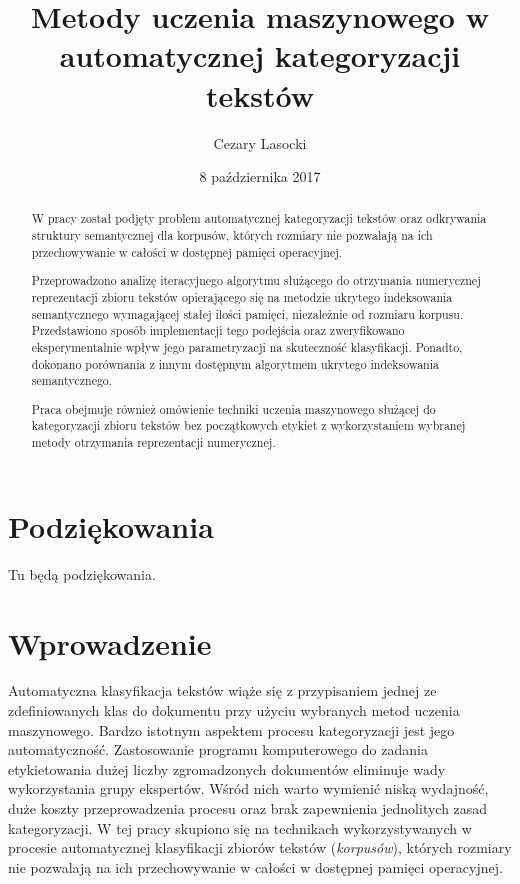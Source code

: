 \documentclass{pracamgr}
\author{Cezary Lasocki}
\title{Metody uczenia maszynowego w automatycznej kategoryzacji tekstów}
\date{8 października 2017}
\begin{document}
\maketitle

\begin{abstract}

W pracy został podjęty problem automatycznej kategoryzacji tekstów oraz odkrywania struktury semantycznej dla korpusów, których rozmiary nie pozwalają na ich przechowywanie w całości w dostępnej pamięci operacyjnej.

Przeprowadzono analizę iteracyjnego algorytmu służącego do otrzymania numerycznej reprezentacji zbioru tekstów opierającego się na metodzie ukrytego indeksowania semantycznego wymagającej stałej ilości pamięci, niezależnie od rozmiaru korpusu. Przedstawiono sposób implementacji tego podejścia oraz zweryfikowano eksperymentalnie wpływ jego parametryzacji na skuteczność klasyfikacji. Ponadto, dokonano porównania z innym dostępnym algorytmem ukrytego indeksowania semantycznego. 

Praca obejmuje również omówienie techniki uczenia maszynowego służącej do kategoryzacji zbioru tekstów bez początkowych etykiet z wykorzystaniem wybranej metody otrzymania reprezentacji numerycznej.
\end{abstract}

\chapter*{Podziękowania}

Tu będą podziękowania.

\tableofcontents

\chapter{Wprowadzenie}

Automatyczna klasyfikacja tekstów wiąże się z przypisaniem jednej ze zdefiniowanych klas do dokumentu przy użyciu wybranych metod uczenia maszynowego. Bardzo istotnym aspektem procesu kategoryzacji jest jego automatyczność. Zastosowanie programu komputerowego do zadania etykietowania dużej liczby zgromadzonych dokumentów eliminuje wady wykorzystania grupy ekspertów. Wśród nich warto wymienić niską wydajność, duże koszty przeprowadzenia procesu oraz brak zapewnienia jednolitych zasad kategoryzacji. W tej pracy skupiono się na technikach wykorzystywanych w procesie automatycznej klasyfikacji zbiorów tekstów (\textit{korpusów}), których rozmiary nie pozwalają na ich przechowywanie w całości w dostępnej pamięci operacyjnej.
\end{document}
